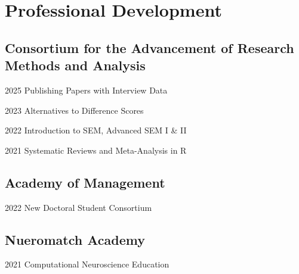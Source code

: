 \documentclass[11pt,letterpaper]{report} %
\begin{document}





    \section*{Professional Development}

    \subsection*{Consortium for the Advancement of Research Methods and Analysis}

    \begin{tablist}
    
        \item[2025] \tab{}Publishing Papers with Interview Data
        \item[2023] \tab{}Alternatives to Difference Scores
        \item[2022] \tab{}Introduction to SEM, Advanced SEM I \& II
        \item[2021] \tab{}Systematic Reviews and Meta-Analysis in R

    \end{tablist}

    \subsection*{Academy of Management}

    \begin{tablist}
        \item[2022] \tab{}New Doctoral Student Consortium
        
    \end{tablist}

    \subsection*{Nueromatch Academy}

    \begin{tablist}
        \item[2021] \tab{}Computational Neuroscience Education
        
    \end{tablist}
\end{document}
